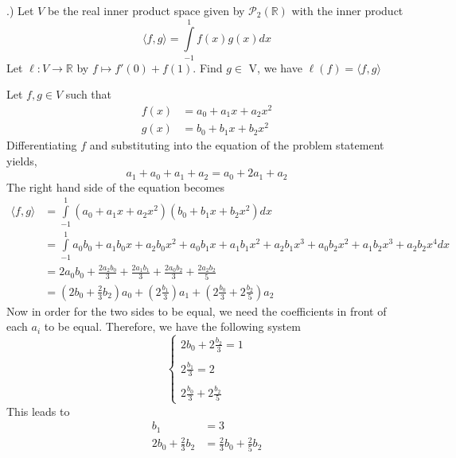 \documentclass[a4paper, 11pt]{article}
\newcommand{\R}{\mathbb{R}}
\newenvironment{solution}{%
	\begin{list}{}{%
			\setlength{\topsep}{0pt}%
			\setlength{\leftmargin}{1.5cm}%
			\setlength{\rightmargin}{1.5cm}%
			\setlength{\listparindent}{\parindent}%
			\setlength{\itemindent}{\parindent}%
			\setlength{\parsep}{\parskip}%
		}%
		\item[]}{\end{list}}
\begin{document}
.) Let $V$ be the real inner product space given by $\mathcal{P}_2(\R)$ with the inner product
\begin{equation*}
  \langle f,g \rangle = \int\limits_{-1}^1 f(x)g(x)dx
\end{equation*}
Let $\ell:V\to\R$ by $f\mapsto f'(0)+f(1)$. Find $g\in$ V, we have $\ell(f)=\langle f,g \rangle$\\

\begin{solution}
  \noindent Let $f,g \in V$ such that
  \begin{align*}
    f(x) &= a_0 + a_1x + a_2x^2 \\
    g(x) &= b_0 + b_1x + b_2x^2
  \end{align*}
  Differentiating $f$ and substituting into the equation of the problem statement yields,
  \begin{equation*}
    a_1 + a_0 + a_1 + a_2 = a_0+2a_1+a_2
  \end{equation*}
  The right hand side of the equation becomes
  \begin{align*}
    \langle f,g \rangle &= \int\limits_{-1}^1 (a_0+a_1x+a_2x^2)(b_0+b_1x+b_2x^2)dx \\
    &=\int\limits_{-1}^1 a_0b_0 + a_1b_0x + a_2b_0x^2 + a_0b_1x + a_1b_1x^2+a_2b_1x^3+a_0b_2x^2+a_1b_2x^3+a_2b_2x^4 dx\\
    &=2a_0b_0 + \frac{2a_2b_0}{3} + \frac{2a_1b_1}{3} + \frac{2a_0b_2}{3} + \frac{2a_2b_2}{5} \\
    &= \left(2b_0+\frac{2}{3}b_2\right)a_0 + \left(2\frac{b_1}{3}\right)a_1 + \left(2\frac{b_0}{3}+2\frac{b_2}{5}   \right)a_2
  \end{align*}
  Now in order for the two sides to be equal, we need the coefficients in front of each $a_i$ to be equal. Therefore, we have the following system
  \begin{equation*}
    \begin{cases}
      2b_0+2\frac{b_2}{3} = 1 \\\\
      2\frac{b_1}{3} = 2 \\\\
      2\frac{b_0}{3}+2\frac{b_2}{5}
      \end{cases}
  \end{equation*}
  This leads to
  \begin{align*}
    b_1 &= 3 \\
    2b_0 + \frac{2}{3}b_2 &= \frac{2}{3}b_0 + \frac{2}{5}b_2\\

\end{align*}
\end{solution}
\end{document}

